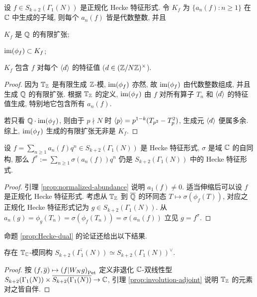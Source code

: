 \begin{corollary}\label{prop:algebraic-eigenvalue}
	设 $f \in S_{k+2}(\Gamma_1(N))$ 是正规化 Hecke 特征形式. 令 $K_f$ 为 $\{a_n(f) : n \geq 1\}$ 在 $\mathbb{C}$ 中生成的子域, 则每个 $a_n(f)$ 皆是代数整数, 并且
	\begin{compactitem}
		\item $K_f$ 是 $\mathbb{Q}$ 的有限扩张;
		\item $\operatorname{im}(\phi_f) \subset K_f$;
		\item $K_f$ 包含 $f$ 对每个 $\left\langle d \right\rangle$ 的特征值 ($d \in (\mathbb{Z}/N\mathbb{Z})^\times$).
	\end{compactitem}
\end{corollary}
\begin{proof}
	因为 $\mathbb{T}_{\mathbb{Z}}$ 是有限生成 $\mathbb{Z}$-模, $\operatorname{im}(\phi_f)$ 亦然, 故 $\operatorname{im}(\phi_f)$ 由代数整数组成, 并且生成 $\mathbb{Q}$ 的有限扩张. 根据 $\mathbb{T}_{\mathbb{Z}}$ 的定义, $\operatorname{im}(\phi_f)$ 由 $f$ 对所有算子 $T_n$ 和 $\left\langle d \right\rangle$ 的特征值生成, 特别地它包含所有 $a_n(f)$.
	
	若只看 $\mathbb{Q} \cdot \operatorname{im}(\phi_f)$, 则由于 $p \nmid N$ 时 $\left\langle p \right\rangle = p^{1-k}(T_{p^2} - T_p^2)$, 生成元 $\left\langle d \right\rangle$ 便属多余. 综上, $\operatorname{im}(\phi_f)$ 生成的有限扩张无非是 $K_f$.
\end{proof}

\begin{corollary}\label{prop:Fourier-coeff-conjugate}
	设 $f = \sum_{n \geq 1} a_n(f) q^n \in S_{k+2}(\Gamma_1(N))$ 是 Hecke 特征形式, $\sigma$ 是域 $\mathbb{C}$ 的自同构, 那么 $f^\sigma := \sum_{n \geq 1} \sigma(a_n(f)) q^n$ 仍是 $S_{k+2}(\Gamma_1(N))$ 中的 Hecke 特征形式.
\end{corollary}
\begin{proof}
	引理 \ref{prop:normalized-abundance} 说明 $a_1(f) \neq 0$. 适当伸缩后可以设 $f$ 是正规化 Hecke 特征形式. 考虑从 $\mathbb{T}_{\mathbb{Z}}$ 到 $\overline{\mathbb{Q}}$ 的环同态 $T \mapsto \sigma(\phi_f(T))$, 对应之正规化 Hecke 特征形式记为 $g \in S_{k+2}(\Gamma_1(N))$. 从 $a_n(g) = \phi_g(T_n) = \sigma(\phi_f(T_n)) = \sigma(a_n(f))$ 立见 $g = f^\sigma$.
\end{proof}

命题 \ref{prop:Hecke-dual} 的论证还给出以下结果.
\begin{lemma}\label{prop:S-conj-Hecke}
	存在 $\mathbb{T}_{\mathbb{C}}$-模同构 $\overline{S_{k+2}(\Gamma_1(N))} \simeq S_{k+2}(\Gamma_1(N))^\vee$.
\end{lemma}
\begin{proof}
	按 $(f, \overline{g}) \mapsto \left( f \middle| W_N g \right)_{\mathrm{Pet}}$ 定义非退化 $\mathbb{C}$-双线性型 $S_{k+2}(\Gamma_1(N)) \times \overline{S_{k+2}(\Gamma_1(N))} \to \mathbb{C}$, 引理 \ref{prop:involution-adjoint} 说明 $\mathbb{T}_{\mathbb{Z}}$ 的元素对之皆自伴.
\end{proof}

